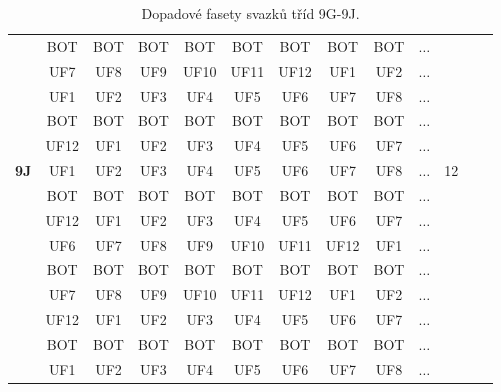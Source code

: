 \begin{table}[h!]
\begin{tabular}{|l|c|c|c|c|c|c|c|c|c|c|c|c|}
 & BOT & BOT & BOT & BOT & BOT & BOT & BOT & BOT & $\dots$ & \\
 & UF7 & UF8 & UF9 & UF10 & UF11 & UF12 & UF1 & UF2 & $\dots$ & \\
 & UF1 & UF2 & UF3 & UF4 & UF5 & UF6 & UF7 & UF8 & $\dots$ & \\
 & BOT & BOT & BOT & BOT & BOT & BOT & BOT & BOT & $\dots$ & \\
 & UF12 & UF1 & UF2 & UF3 & UF4 & UF5 & UF6 & UF7 & $\dots$ & \\
\hline\hline
\textbf{9J} & UF1 & UF2 & UF3 & UF4 & UF5 & UF6 & UF7 & UF8 & $\dots$ & 12\\
 & BOT & BOT & BOT & BOT & BOT & BOT & BOT & BOT & $\dots$ & \\
 & UF12 & UF1 & UF2 & UF3 & UF4 & UF5 & UF6 & UF7 & $\dots$ & \\
 & UF6 & UF7 & UF8 & UF9 & UF10 & UF11 & UF12 & UF1 & $\dots$ & \\
 & BOT & BOT & BOT & BOT & BOT & BOT & BOT & BOT & $\dots$ & \\
 & UF7 & UF8 & UF9 & UF10 & UF11 & UF12 & UF1 & UF2 & $\dots$ & \\
 & UF12 & UF1 & UF2 & UF3 & UF4 & UF5 & UF6 & UF7 & $\dots$ & \\
 & BOT & BOT & BOT & BOT & BOT & BOT & BOT & BOT & $\dots$ & \\
 & UF1 & UF2 & UF3 & UF4 & UF5 & UF6 & UF7 & UF8 & $\dots$ & \\
\hline 
\end{tabular}
\caption{Dopadové fasety svazků tříd 9G-9J.}
\label{table:TableClasses6}
\end{table}



